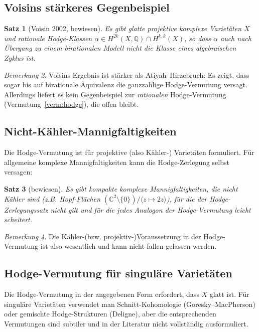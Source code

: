 \documentclass[12pt,a4paper]{amsart}
\newtheorem{theorem}{Satz}[section]
\theoremstyle{definition}
\theoremstyle{remark}
\newtheorem{bemerkung}[theorem]{Bemerkung}
\begin{document}
\subsection{Voisins stärkeres Gegenbeispiel}

\begin{theorem}[Voisin 2002, bewiesen]
\label{thm:voisin}
Es gibt glatte projektive komplexe Varietäten $X$ und rationale Hodge-Klassen
$\alpha \in H^{2k}(X, \mathbb{Q}) \cap H^{k,k}(X)$, so dass $\alpha$ auch nach
Übergang zu einem birationalen Modell nicht die Klasse eines algebraischen Zyklus ist.
\end{theorem}

\begin{bemerkung}
Voisins Ergebnis \cite{voisin2002} ist stärker als Atiyah–Hirzebruch: Es zeigt, dass
sogar bis auf birationale Äquivalenz die ganzzahlige Hodge-Vermutung versagt.
Allerdings liefert es kein Gegenbeispiel zur \emph{rationalen} Hodge-Vermutung
(Vermutung~\ref{verm:hodge}), die offen bleibt.
\end{bemerkung}

\subsection{Nicht-Kähler-Mannigfaltigkeiten}

Die Hodge-Vermutung ist für projektive (also Kähler-) Varietäten formuliert.
Für allgemeine komplexe Mannigfaltigkeiten kann die Hodge-Zerlegung selbst versagen:

\begin{theorem}[bewiesen]
Es gibt kompakte komplexe Mannigfaltigkeiten, die nicht Kähler sind (z.B. Hopf-Flächen
$(\mathbb{C}^2 \setminus \{0\})/\langle z \mapsto 2z \rangle$), für die der
Hodge-Zerlegungssatz nicht gilt und für die jedes Analogon der Hodge-Vermutung
leicht scheitert.
\end{theorem}

\begin{bemerkung}
Die Kähler-(bzw. projektiv-)Voraussetzung in der Hodge-Vermutung ist also wesentlich
und kann nicht fallen gelassen werden.
\end{bemerkung}

\subsection{Hodge-Vermutung für singuläre Varietäten}

Die Hodge-Vermutung in der angegebenen Form erfordert, dass $X$ glatt ist. Für
singuläre Varietäten verwendet man Schnitt-Kohomologie (Goresky–MacPherson) oder
gemischte Hodge-Strukturen (Deligne), aber die entsprechenden Vermutungen sind
subtiler und in der Literatur nicht vollständig ausformuliert.
\end{document}
